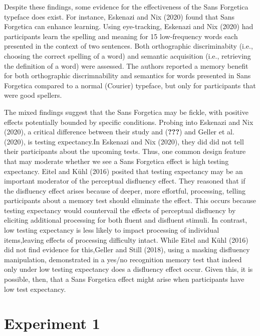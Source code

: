 \documentclass[
  english,
  man]{apa6}
\begin{document}
Despite these findings, some evidence for the effectiveness of the Sans Forgetica typeface does exist. For instance, Eskenazi and Nix (2020) found that Sans Forgetica can enhance learning. Using eye-tracking, Eskenazi and Nix (2020) had participants learn the spelling and meaning for 15 low-frequency words each presented in the context of two sentences. Both orthographic discriminabity (i.e., choosing the correct spelling of a word) and semantic acquisition (i.e., retrieving the definition of a word) were assessed. The authors reported a memory benefit for both orthographic discrimnability and semantics for words presented in Sans Forgetica compared to a normal (Courier) typeface, but only for participants that were good spellers.

The mixed findings suggest that the Sans Forgetica may be fickle, with positive effects potentially bounded by specific conditions. Probing into Eskenazi and Nix (2020), a critical difference between their study and ({\textbf{???}}) and Geller et al. (2020), is testing expectancy.In Eskenazi and Nix (2020), they did did not tell their participants about the upcoming tests. Thus, one common design feature that may moderate whether we see a Sans Forgetica effect is high testing expectancy. Eitel and Kühl (2016) posited that testing expectancy may be an important moderator of the perceptual disfluency effect. They reasoned that if the disfluency effect arises because of deeper, more effortful, processing, telling participants about a memory test should eliminate the effect. This occurs because testing expectancy would countervail the effects of perceptual disfluency by eliciting additional processing for both fluent and disfluent stimuli. In contrast, low testing expectancy is less likely to impact processing of individual items,leaving effects of processing difficulty intact. While Eitel and Kühl (2016) did not find evidence for this,Geller and Still (2018), using a masking disfluency manipulation, demonstrated in a yes/no recognition memory test that indeed only under low testing expectancy does a disfluency effect occur. Given this, it is possible, then, that a Sans Forgetica effect might arise when participants have low test expectancy.

\hypertarget{experiment-1}{%
\section{Experiment 1}\label{experiment-1}}
\end{document}
